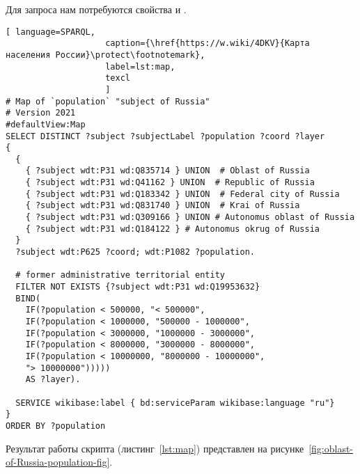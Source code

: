 Для запроса нам потребуются свойства  и .

\begin{lstlisting}[ language=SPARQL, 
                    caption={\href{https://w.wiki/4DKV}{Карта населения России}\protect\footnotemark},
                    label=lst:map,
                    texcl 
                    ]
# Map of `population` "subject of Russia"
# Version 2021
#defaultView:Map
SELECT DISTINCT ?subject ?subjectLabel ?population ?coord ?layer
{
  {
    { ?subject wdt:P31 wd:Q835714 } UNION  # Oblast of Russia
    { ?subject wdt:P31 wd:Q41162 } UNION  # Republic of Russia
    { ?subject wdt:P31 wd:Q183342 } UNION  # Federal city of Russia
    { ?subject wdt:P31 wd:Q831740 } UNION  # Krai of Russia
    { ?subject wdt:P31 wd:Q309166 } UNION # Autonomus oblast of Russia
    { ?subject wdt:P31 wd:Q184122 } # Autonomus okrug of Russia
  }   
  ?subject wdt:P625 ?coord; wdt:P1082 ?population.
  
  # former administrative territorial entity
  FILTER NOT EXISTS {?subject wdt:P31 wd:Q19953632}
  BIND(
    IF(?population < 500000, "< 500000",
    IF(?population < 1000000, "500000 - 1000000",
    IF(?population < 3000000, "1000000 - 3000000",
    IF(?population < 8000000, "3000000 - 8000000",
    IF(?population < 10000000, "8000000 - 10000000",
    "> 10000000")))))
    AS ?layer).
  
  SERVICE wikibase:label { bd:serviceParam wikibase:language "ru"}
}
ORDER BY ?population
\end{lstlisting}%

Результат работы скрипта (листинг~\protect\ref{lst:map}) представлен на рисунке~\ref{fig:oblast-of-Russia-population-fig}.

\begin{figure*}[!h]
    \setlength{\fboxsep}{0pt}%
    \setlength{\fboxrule}{1pt}%
	\caption[Карта населения России, 2021.]{Карта населения Российской Федерации, 2021. Карта субъектов Российской Федерации, разделённых на 6 групп по количеству населения и отмеченных разными цветами в зависимости от группы, в которую субъект входит. Карта построена на основе данных, полученных с помощью запроса~\protect\ref{lst:oblast-of-Russia}.}%
	\label{fig:oblast-of-Russia-population-fig}%
\end{figure*} 

